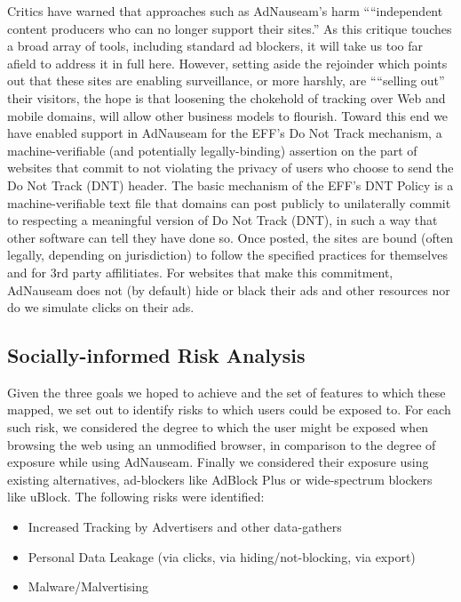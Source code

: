 \documentclass[conference]{IEEEtran}
\begin{document}
Critics have warned that approaches such as AdNauseam's harm ““independent content producers who can no longer support their sites.” As this critique touches a broad array of tools, including standard ad blockers, it will take us too far afield to address it in full here.  However, setting aside the rejoinder which points out that these sites are enabling surveillance, or more harshly, are ““selling out” their visitors, the hope is that loosening the chokehold of tracking over Web and mobile domains, will allow other business models to flourish. Toward this end we have enabled support in AdNauseam for the EFF's Do Not Track mechanism, a machine-verifiable (and potentially legally-binding) assertion on the part of websites that commit to not violating the privacy of users who choose to send the Do Not Track (DNT) header. The basic mechanism of the EFF's DNT Policy is a machine-verifiable text file that domains can post publicly to unilaterally commit to respecting a meaningful version of Do Not Track (DNT), in such a way that other software can tell they have done so. Once posted, the sites are bound (often legally, depending on jurisdiction) to follow the specified practices for themselves and for 3rd party affilitiates. For websites that make this commitment, AdNauseam does not (by default) hide or black their ads and other resources nor do we simulate clicks on their ads.

\subsection{Socially-informed Risk Analysis}

Given the three goals we hoped to achieve and the set of features to which these mapped, we set out to identify risks to which users could be exposed to. For each such risk, we considered the degree to which the user might be exposed when browsing the web using an unmodified browser, in comparison to the degree of exposure while using AdNauseam. Finally we considered their exposure using existing alternatives, ad-blockers like AdBlock Plus\cite{AdBlock} or wide-spectrum blockers like uBlock\cite{Gorhill}. The following risks were identified:

\begin{itemize}
  \item Increased Tracking by Advertisers and other data-gathers
  \item Personal Data Leakage (via clicks, via hiding/not-blocking, via export)
  \item Malware/Malvertising
\end{itemize}
\end{document}
